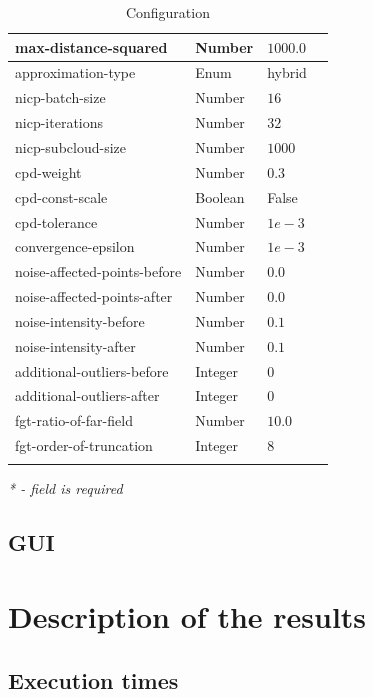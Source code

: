 \documentclass[titlepage]{article}
\begin{document}
\begin{center}
\begin{longtable}{ | m{13em} | m{5em} | m{3em}| m{19em}| }
 \hline
 max-distance-squared & Number & $1000.0$ & \\ 
 \hline
 approximation-type & Enum & hybrid & \\ 
 \hline
 nicp-batch-size & Number & $16$ & \\ 
 \hline
 nicp-iterations & Number & $32$ & \\ 
 \hline
 nicp-subcloud-size & Number & $1000$ & \\ 
 \hline 
 cpd-weight & Number & $0.3$ & \\ 
 \hline
 cpd-const-scale & Boolean & False & \\ 
 \hline
 cpd-tolerance & Number & $1e-3$ & \\ 
 \hline
 convergence-epsilon & Number & $1e-3$ & \\ 
 \hline
 noise-affected-points-before & Number & $0.0$ & \\ 
 \hline
 noise-affected-points-after & Number & $0.0$ & \\ 
 \hline
 noise-intensity-before & Number & $0.1$ & \\ 
 \hline
 noise-intensity-after & Number & $0.1$ & \\ 
 \hline
 additional-outliers-before & Integer & $0$ & \\ 
 \hline
 additional-outliers-after & Integer & $0$ & \\ 
 \hline
 fgt-ratio-of-far-field & Number & $10.0$ & \\ 
 \hline
 fgt-order-of-truncation & Integer & $8$ & \\ 
 \hline
 \caption{Configuration}
\end{longtable}
\label{tab:configuration}
\end{center}
\textit{* - field is required}




\subsection{GUI}

\section{Description of the results}

\subsection{Execution times}
\end{document}
